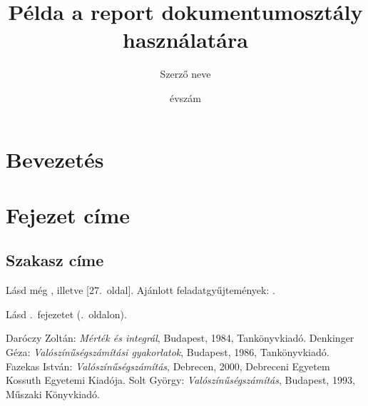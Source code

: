 \documentclass[12pt,twoside]{report}
\begin{document}
	\title{Példa a report dokumentumosztály
		használatára}
	\author{Szerző neve}
	\date{évszám}
	\maketitle
	\tableofcontents
\chapter*{Bevezetés}
\markboth{}{}
\hulipsum
\chapter{Fejezet címe}\label{fejezet-xy}
\section{Szakasz címe}
\hulipsum

Lásd még \cite{FAZEKAS}, illetve \cite{DAROCZY}[27.~oldal]. Ajánlott feladatgyűjtemények: \cite{DENKINGER,SOLT}.

Lásd \az{\ref{fejezet-xy}}.~fejezetet (\az{\pageref{fejezet-xy}}.~oldalon).
\begin{thebibliography}{4}
 Daróczy Zoltán: \emph{Mérték és integrál}, Budapest, 1984, Tankönyvkiadó.
 Denkinger Géza: \emph{Valószínűségszámítási gyakorlatok}, Budapest, 1986, Tankönyvkiadó.
 Fazekas István: \emph{Valószínűségszámítás}, Debrecen, 2000, Debreceni Egyetem
Kossuth Egyetemi Kiadója.
 Solt György: \emph{Valószínűségszámítás}, Budapest, 1993, Műszaki Könyvkiadó.
\end{thebibliography}
\end{document}

